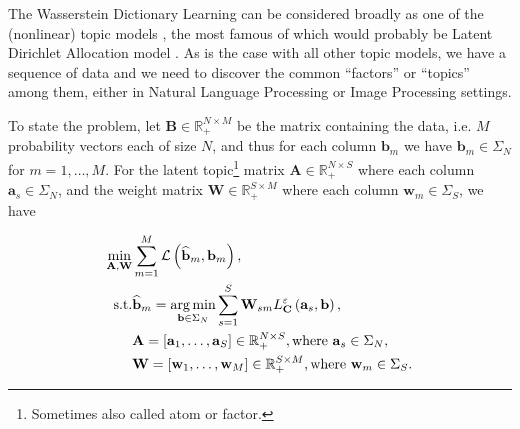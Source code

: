 The Wasserstein Dictionary Learning can be considered broadly as one of the (nonlinear) topic models \citep{blei2009},
the most famous of which would probably be Latent Dirichlet Allocation model \citep{blei2003}.
As is the case with all other topic models,
we have a sequence of data and we need to discover the common ``factors'' or ``topics'' among them,
either in Natural Language Processing \citep{xu2018} or Image Processing \citep{schmitz2018} settings.

To state the problem,
let $\mathbf{B} \in \mathbb{R}_+^{N\times M}$ be the matrix containing the data,
i.e. $M$ probability vectors each of size $N$,
and thus for each column $\mathbf{b}_m$ we have $\mathbf{b}_m \in \Sigma_N$
for $m = 1, \ldots, M$.
For the latent topic\footnote{
  Sometimes also called atom or factor.
} matrix $\mathbf{A} \in \mathbb{R}_+^{N \times S}$ where each column $\mathbf{a}_s \in \Sigma_N$,
and the weight matrix $\mathbf{W} \in \mathbb{R}_+^{S \times M}$ where each column $\mathbf{w}_m \in \Sigma_S$,
we have

\begin{equation}\label{eqn:wasserstein-dictionary-problem-constrained}
  \begin{aligned}
    \min_{\mathbf{A}, \mathbf{W}}
     &
    \sum_{m = 1}^M \mathcal{L} \left(\widehat{\mathbf{b}}_m, \mathbf{b}_m\right),                    \\
    \text{s.t.}
     & \widehat{\mathbf{b}}_m =
    \operatorname*{arg\,min}_{\mathbf{b} \in \Sigma_N}
    \sum_{s = 1}^S \mathbf{W}_{sm} L_{\mathbf{C}}^\varepsilon \left(\mathbf{a}_s, \mathbf{b}\right), \\
     & \mathbf{A} = \left[\mathbf{a}_1, \ldots, \mathbf{a}_S\right] \in \mathbb{R}_+^{N \times S},
    \text{where } \mathbf{a}_s \in \Sigma_N,                                                         \\
     & \mathbf{W} = \left[\mathbf{w}_1, \ldots, \mathbf{w}_M\right] \in \mathbb{R}_+^{S \times M},
    \text{where } \mathbf{w}_m \in \Sigma_S.
  \end{aligned}
\end{equation}





